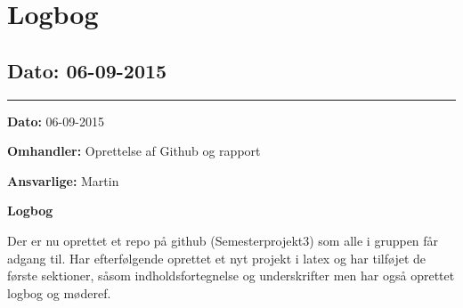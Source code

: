 \chapter{Logbog}

\section{Dato: 06-09-2015}
\hrule

\textbf{Dato:} 06-09-2015

\textbf{Omhandler:} Oprettelse af Github og rapport

\textbf{Ansvarlige:} Martin

\textbf{Logbog}

Der er nu oprettet et repo på github (Semesterprojekt3) som alle i gruppen får adgang til. Har efterfølgende oprettet et nyt projekt i latex og har tilføjet de første sektioner, såsom indholdsfortegnelse og underskrifter men har også oprettet logbog og møderef.
